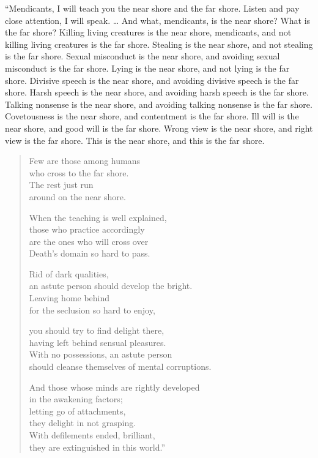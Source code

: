 \documentclass[12pt,openany]{book}%
\begin{document}
“Mendicants, I will teach you the near shore and the far shore. Listen and pay close attention, I will speak. … And what, mendicants, is the near shore? What is the far shore? Killing living creatures is the near shore, mendicants, and not killing living creatures is the far shore. Stealing is the near shore, and not stealing is the far shore. Sexual misconduct is the near shore, and avoiding sexual misconduct is the far shore. Lying is the near shore, and not lying is the far shore. Divisive speech is the near shore, and avoiding divisive speech is the far shore. Harsh speech is the near shore, and avoiding harsh speech is the far shore. Talking nonsense is the near shore, and avoiding talking nonsense is the far shore. Covetousness is the near shore, and contentment is the far shore. Ill will is the near shore, and good will is the far shore. Wrong view is the near shore, and right view is the far shore. This is the near shore, and this is the far shore. 

\begin{verse}%
Few are those among humans \\
who cross to the far shore. \\
The rest just run \\
around on the near shore. 

When the teaching is well explained, \\
those who practice accordingly \\
are the ones who will cross over \\
Death’s domain so hard to pass. 

Rid of dark qualities, \\
an astute person should develop the bright. \\
Leaving home behind \\
for the seclusion so hard to enjoy, 

you should try to find delight there, \\
having left behind sensual pleasures. \\
With no possessions, an astute person \\
should cleanse themselves of mental corruptions. 

And those whose minds are rightly developed \\
in the awakening factors; \\
letting go of attachments, \\
they delight in not grasping. \\
With defilements ended, brilliant, \\
they are extinguished in this world.” 

%
\end{verse}
\end{document}
